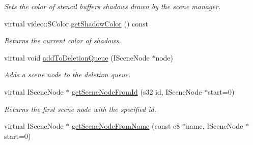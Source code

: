 \begin{DoxyCompactItemize}
\begin{DoxyCompactList}\small\item\em Sets the color of stencil buffers shadows drawn by the scene manager. \end{DoxyCompactList}\item 
\hypertarget{classirr_1_1scene_1_1_c_scene_manager_a19cc0874c44ff6404d8ee5ffaaa3f51b}{virtual video\-::\-S\-Color \hyperlink{classirr_1_1scene_1_1_c_scene_manager_a19cc0874c44ff6404d8ee5ffaaa3f51b}{get\-Shadow\-Color} () const }\label{classirr_1_1scene_1_1_c_scene_manager_a19cc0874c44ff6404d8ee5ffaaa3f51b}

\begin{DoxyCompactList}\small\item\em Returns the current color of shadows. \end{DoxyCompactList}\item 
\hypertarget{classirr_1_1scene_1_1_c_scene_manager_a3eb88416967e189c7f28daee000cdd5c}{virtual void \hyperlink{classirr_1_1scene_1_1_c_scene_manager_a3eb88416967e189c7f28daee000cdd5c}{add\-To\-Deletion\-Queue} (I\-Scene\-Node $\ast$node)}\label{classirr_1_1scene_1_1_c_scene_manager_a3eb88416967e189c7f28daee000cdd5c}

\begin{DoxyCompactList}\small\item\em Adds a scene node to the deletion queue. \end{DoxyCompactList}\item 
\hypertarget{classirr_1_1scene_1_1_c_scene_manager_a2e4dee53779b3de8c3f4323d3c687a56}{virtual I\-Scene\-Node $\ast$ \hyperlink{classirr_1_1scene_1_1_c_scene_manager_a2e4dee53779b3de8c3f4323d3c687a56}{get\-Scene\-Node\-From\-Id} (s32 id, I\-Scene\-Node $\ast$start=0)}\label{classirr_1_1scene_1_1_c_scene_manager_a2e4dee53779b3de8c3f4323d3c687a56}

\begin{DoxyCompactList}\small\item\em Returns the first scene node with the specified id. \end{DoxyCompactList}\item 
\hypertarget{classirr_1_1scene_1_1_c_scene_manager_a33dc0e7cc05dc8dfc5f5df497f5cced8}{virtual I\-Scene\-Node $\ast$ \hyperlink{classirr_1_1scene_1_1_c_scene_manager_a33dc0e7cc05dc8dfc5f5df497f5cced8}{get\-Scene\-Node\-From\-Name} (const c8 $\ast$name, I\-Scene\-Node $\ast$start=0)}\label{classirr_1_1scene_1_1_c_scene_manager_a33dc0e7cc05dc8dfc5f5df497f5cced8}


\end{DoxyCompactItemize}
